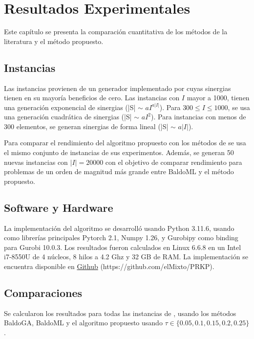 \documentclass[spanish, a4paper, 12pt, openany,final]{book}
\begin{document}
 
 
 
\clearpage
\chapter{Resultados Experimentales}
Este capítulo se presenta la comparación cuantitativa de los métodos de la literatura y el método propuesto.

\section{Instancias}

Las instancias provienen de un generador implementado por \cite{baldo_polynomial_2023} cuyas sinergias tienen en su mayoría beneficios de cero. Las instancias con $I$ mayor a 1000, tienen una generación exponencial de sinergias (|S| $\sim$ $aI^{a|I|}$). Para $300 \le I \le 1000$, se usa una generación cuadrática de sinergias (|S| $\sim$ $aI^{2}$). Para instancias con menos de 300 elementos, se generan sinergias de forma lineal (|S| $\sim$ $a|I|$).

Para comparar el rendimiento del algoritmo propuesto con los métodos de \cite{baldo_polynomial_2023} se usa el mismo conjunto de instancias de sus experimentos. Además, se generan 50 nuevas instancias con $|I| = 20000$ con el objetivo de comparar rendimiento para problemas de un orden de magnitud más grande entre BaldoML y el método propuesto.

\section{Software y Hardware}

La implementación del algoritmo se desarrolló usando Python 3.11.6, usando como librerías principales Pytorch 2.1, Numpy 1.26, y Gurobipy como binding para Gurobi 10.0.3. Los resultados fueron calculados en Linux 6.6.8 en un Intel i7-8550U de 4 núcleos, 8 hilos a 4.2 Ghz y 32 GB de RAM. La implementación se encuentra disponible en \href{https://github.com/elMixto/PRKP.git}{Github} (https://github.com/elMixto/PRKP).

\section{Comparaciones}


Se calcularon los resultados para todas las instancias de \cite{baldo_polynomial_2023}, usando los métodos BaldoGA, BaldoML y el algoritmo propuesto usando $\tau \in \{0.05,0.1,0.15,0.2,0.25 \}$.
\end{document}
